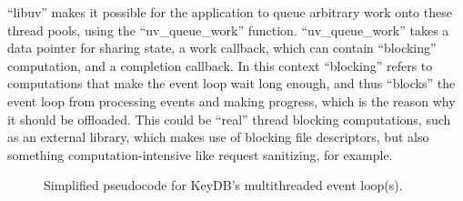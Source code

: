 “libuv” makes it possible for the application to queue arbitrary work onto these thread pools, using the “uv\_queue\_work” function. “uv\_queue\_work” takes a data pointer for sharing state, a work callback, which can contain “blocking” computation, and a completion callback. In this context “blocking” refers to computations that make the event loop wait long enough, and thus “blocks” the event loop from processing events and making progress, which is the reason why it should be offloaded. This could be “real” thread blocking computations, such as an external library, which makes use of blocking file descriptors, but also something computation-intensive like request sanitizing, for example.
\begin{figure}
  \centering
  
  \caption{Simplified pseudocode for KeyDB's multithreaded event loop(s).}
  \label{fig:keydb_code}
\end{figure}

